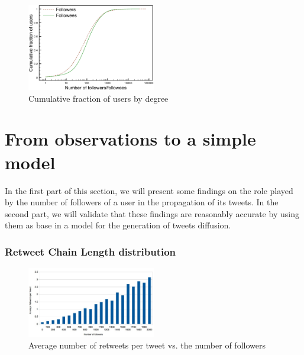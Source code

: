\documentclass[conference]{IEEEtran}
\begin{document}
\begin{figure}[h]
\includegraphics[width=0.5\textwidth]{data/degreesDistribution.eps}
\caption{Cumulative fraction of users by degree}

    \label{fig:followernet}
\end{figure}



\section{From observations to a simple model}

In the first part of this section, we will present some findings on the role played by the number of followers of a user in the propagation of its tweets. In the second part, we will validate that these findings are reasonably accurate by using them as base in a model for the generation of tweets diffusion.

\subsubsection{Retweet Chain Length distribution}


  \begin{figure}[h]
\includegraphics[width=0.5\textwidth]{data/averageRT.jpg}
\caption{Average number of retweets per tweet vs. the number of followers}

    \label{fig:averageRT}
\end{figure}
\end{document}
